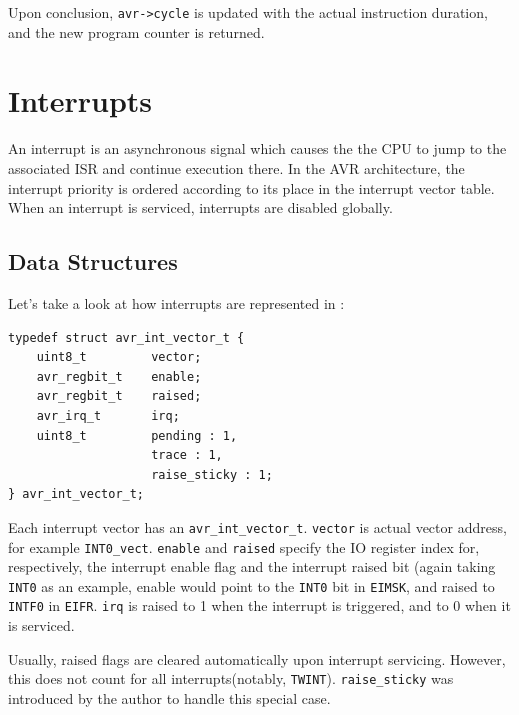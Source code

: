 Upon conclusion, \lstinline|avr->cycle| is updated with the actual instruction
duration, and the new program counter is returned.

\section{Interrupts}

An interrupt is an asynchronous signal which causes the the \ac{CPU} to jump to
the associated \ac{ISR} and continue execution there. In the \ac{AVR} architecture,
the interrupt priority is ordered according to its place in the interrupt
vector table. When an interrupt is serviced, interrupts are disabled globally.

\subsection{Data Structures}

Let's take a look at how interrupts are represented in \simavr:

\begin{lstlisting}
typedef struct avr_int_vector_t {
    uint8_t         vector;
    avr_regbit_t    enable;
    avr_regbit_t    raised;
    avr_irq_t       irq;
    uint8_t         pending : 1,
                    trace : 1,
                    raise_sticky : 1;
} avr_int_vector_t;
\end{lstlisting}

Each interrupt vector has an \lstinline|avr_int_vector_t|. \lstinline|vector| is
actual vector address, for example \lstinline|INT0_vect|. \lstinline|enable|
and \lstinline|raised| specify the \ac{IO} register index for, respectively, the
interrupt enable flag and the interrupt raised bit (again taking \lstinline|INT0|
as an example, enable would point to the \lstinline|INT0| bit in \lstinline|EIMSK|,
and raised to \lstinline|INTF0| in \lstinline|EIFR|. \lstinline|irq| is raised to
1 when the interrupt is triggered, and to 0 when it is serviced.

Usually, raised flags are cleared automatically upon interrupt servicing. However,
this does not count for all interrupts(notably, \lstinline|TWINT|).
\lstinline|raise_sticky| was introduced by the author to handle this special case.

